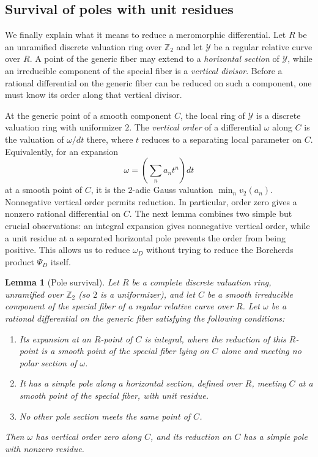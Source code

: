 \documentclass[11pt]{amsart}
\newtheorem{lemma}[theorem]{Lemma}
\theoremstyle{remark}
\numberwithin{equation}{section}
\newcommand{\Z}{\mathbb Z}
\begin{document}
\subsection{Survival of poles with unit residues}

We finally explain what it means to reduce a meromorphic differential.  Let
$R$ be an unramified discrete valuation ring over $\Z_2$ and let $\mathcal Y$
be a regular relative curve over $R$.  A point of the generic fiber may
extend to a \emph{horizontal section} of $\mathcal Y$, while an irreducible
component of the special fiber is a \emph{vertical divisor}.  Before a
rational differential on the generic fiber can be reduced on such a
component, one must know its order along that vertical divisor.

At the generic point of a smooth component $C$, the local ring of
$\mathcal Y$ is a discrete valuation ring with uniformizer $2$.  The
\emph{vertical order} of a differential $\omega$ along $C$ is the valuation
of $\omega/dt$ there, where $t$ reduces to a separating local parameter on
$C$.  Equivalently, for an expansion
\[
 \omega=\left(\sum_n a_nt^n\right)dt
\]
at a smooth point of $C$, it is the $2$-adic Gauss valuation
$\min_n v_2(a_n)$.  Nonnegative vertical order permits reduction.  In particular, order zero
gives a nonzero rational differential on $C$.  The next lemma combines two
simple but crucial observations: an integral expansion gives nonnegative
vertical order, while a unit residue at a separated horizontal pole prevents
the order from being positive.  This allows us to reduce $\omega_D$ without
trying to reduce the Borcherds product $\Psi_D$ itself.

\begin{lemma}[Pole survival]\label{lem:pole-survival}
 Let $R$ be a complete discrete valuation ring, unramified over $\Z_2$ (so
 $2$ is a uniformizer), and
 let $C$ be a smooth irreducible component of the special fiber of a regular
 relative curve over $R$.  Let $\omega$ be a rational differential on the
 generic fiber satisfying the following conditions:
 \begin{enumerate}
 \item Its expansion at an $R$-point of $C$ is integral, where the reduction
 of this $R$-point is a smooth point of the special fiber lying on $C$ alone
 and meeting no polar section of $\omega$.
 \item It has a simple pole along a horizontal section, defined over $R$,
 meeting $C$ at a smooth point of the special fiber, with unit residue.
 \item No other pole section meets the same point of $C$.
 \end{enumerate}
 Then $\omega$ has vertical order zero along $C$, and its reduction on $C$
 has a simple pole with nonzero residue.
\end{lemma}
\end{document}
